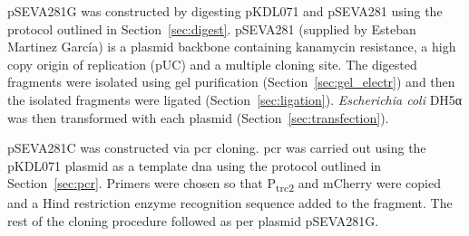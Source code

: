 pSEVA281G was constructed by digesting pKDL071 and pSEVA281 using the protocol outlined in Section~\ref{sec:digest}. pSEVA281 (supplied by Esteban Martinez García) is a plasmid backbone containing kanamycin resistance, a high copy origin of replication (pUC) and a multiple cloning site. The digested fragments were isolated using gel purification (Section~\ref{sec:gel_electr}) and then the isolated fragments were ligated (Section~\ref{sec:ligation}). \textit{Escherichia coli} DH5α was then transformed with each plasmid (Section~\ref{sec:transfection}). 

pSEVA281C was constructed via \acrshort{pcr} cloning. \acrshort{pcr} was carried out using the pKDL071 plasmid as a template \acrshort{dna} using the protocol outlined in Section~\ref{sec:pcr}. Primers were chosen so that P\textsubscript{trc2} and mCherry were copied and a Hind restriction enzyme recognition sequence added to the fragment. The rest of the cloning procedure followed as per plasmid pSEVA281G.


